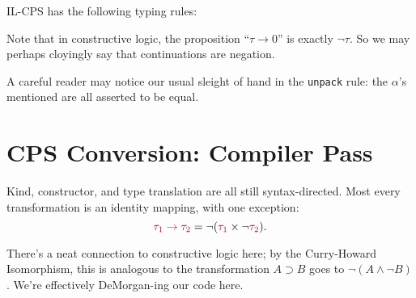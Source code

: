 \documentclass{amsart}
\newcommand{\pack}{\text{\texttt{pack} }}
\newcommand{\unpack}{\text{\texttt{unpack} }}
\newcommand{\iin}{\text{ \texttt{in} }}
\newcommand{\halt}{\text{\texttt{halt}}}
\newcommand{\llet}{\text{\texttt{let} }}
\newcommand{\as}{\text{ \texttt{as} }}
\newcommand{\src}[1]{{\color{purple}#1}}
\begin{document}
IL-CPS has the following typing rules:
Note that in constructive logic, the proposition ``$\tau \rightarrow 0$'' is exactly $\neg\tau$. So we may perhaps cloyingly say that continuations are negation.

A careful reader may notice our usual sleight of hand in the \texttt{unpack} rule: the $\alpha$'s mentioned are all asserted to be equal.

\section{CPS Conversion: Compiler Pass}

Kind, constructor, and type translation are all still syntax-directed. Most every transformation is an identity mapping, with one exception:
\[
\src{\tau_1\rightarrow\tau_2} = \neg(\src{\tau_1} \times \neg \src{\tau_2}).
\]

There's a neat connection to constructive logic here; by the Curry-Howard Isomorphism, this is analogous to the transformation $A\supset B$ goes to $\neg(A\land \neg B)$. We're effectively DeMorgan-ing our code here.
\end{document}
